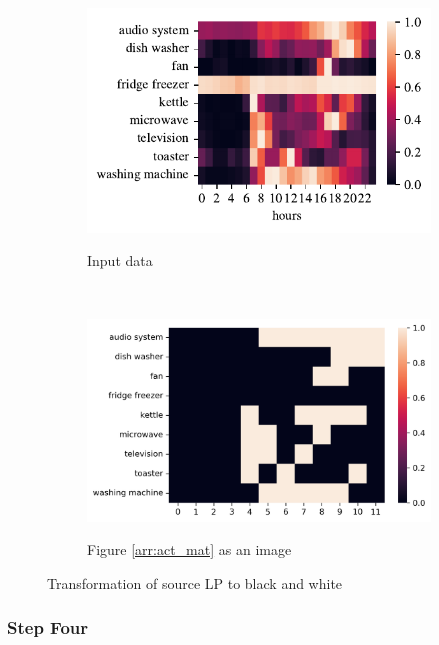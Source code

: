 \begin{figure}[H]
	\begin{subfigure}{.5\textwidth}
		\caption{Input data}
		\includegraphics[width=1\linewidth]{../Figures/LPS/PHPA_profile_for_building.pdf}
		\label{fig:ec_PHPA}
	\end{subfigure}%
	~ 
	\begin{subfigure}{.5\textwidth}
		\caption{Figure \protect\ref{arr:act_mat} as an image}
		\includegraphics[width=1\linewidth]{../Figures/LPS/PHPA_EC.png}
		\label{fig:ec_PHPA_bw}
	\end{subfigure}%

	\caption{Transformation of source LP to black and white}
\end{figure}

\subsubsection{Step Four}

